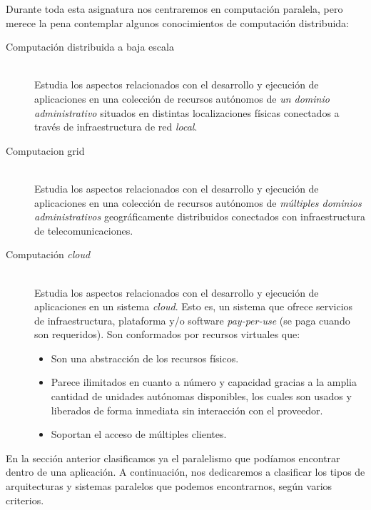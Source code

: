 Durante toda esta asignatura nos centraremos en computación paralela, pero merece la pena contemplar algunos conocimientos de computación distribuida:
\begin{description}
    \item [Computación distribuida a baja escala]~\\
        Estudia los aspectos relacionados con el desarrollo y ejecución de aplicaciones en una colección de recursos autónomos de \emph{un dominio administrativo} situados en distintas localizaciones físicas conectados a través de infraestructura de red \emph{local}.
    \item [Computacion grid]~\\
        Estudia los aspectos relacionados con el desarrollo y ejecución de aplicaciones en una colección de recursos autónomos de \emph{múltiples dominios administrativos} geográficamente distribuidos conectados con infraestructura de telecomunicaciones.
    \item [Computación \textit{cloud}]~\\
        Estudia los aspectos relacionados con el desarrollo y ejecución de aplicaciones en un sistema \textit{cloud}. Esto es, un sistema que ofrece servicios de infraestructura, plataforma y/o software \textit{pay-per-use} (se paga cuando son requeridos). Son conformados por recursos virtuales que:
        \begin{itemize}
            \item Son una abstracción de los recursos físicos.
            \item Parece ilimitados en cuanto a número y capacidad gracias a la amplia cantidad de unidades autónomas disponibles, los cuales son usados y liberados de forma inmediata sin interacción con el proveedor.
            \item Soportan el acceso de múltiples clientes.
        \end{itemize}
\end{description}

En la sección anterior clasificamos ya el paralelismo que podíamos encontrar dentro de una aplicación. A continuación, nos dedicaremos a clasificar los tipos de arquitecturas y sistemas paralelos que podemos encontrarnos, según varios criterios.

